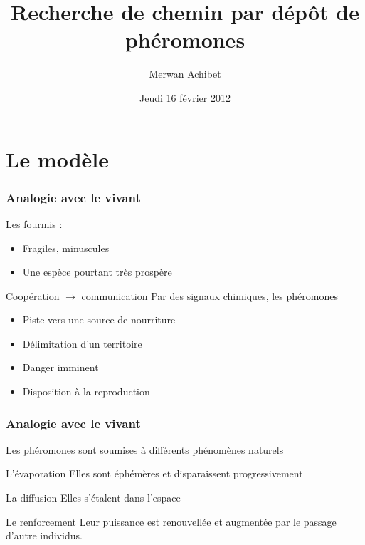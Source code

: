 \documentclass{beamer}
\title{Recherche de chemin par dépôt de phéromones}
\author{Merwan Achibet}
\institute{Université du Havre}
\date{Jeudi 16 février 2012}
\begin{document}
\maketitle

\section{Le modèle}

\begin{frame}

  \frametitle{Analogie avec le vivant}

  \begin{block}{}
    Les fourmis :
    \begin{itemize}
      \item{Fragiles, minuscules}
      \item{Une espèce pourtant très prospère}
    \end{itemize}
  \end{block}

  \vfill

  \begin{block}{Coopération $\rightarrow$ communication}
    Par des signaux chimiques, les phéromones
    \begin{itemize}
      \item{Piste vers une source de nourriture}
      \item{Délimitation d'un territoire}
      \item{Danger imminent}
      \item{Disposition à la reproduction}
    \end{itemize}
  \end{block}

\end{frame}

\begin{frame}

  \frametitle{Analogie avec le vivant}

  Les phéromones sont soumises à différents phénomènes naturels

  \begin{block}{L'évaporation}
    Elles sont éphémères et disparaissent progressivement
  \end{block}

  \begin{block}{La diffusion}
    Elles s'étalent dans l'espace
  \end{block}

  \begin{block}{Le renforcement}
    Leur puissance est renouvellée et augmentée par le passage d'autre
    individus.
  \end{block}

\end{frame}
\end{document}
